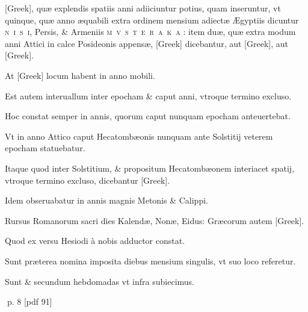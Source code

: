\begin{parnumbers}
\textgreek{[Greek]}, quæ explendis spatiis anni adiiciuntur potius, quam inseruntur, vt quinque, quæ anno æquabili extra ordinem mensium adiectæ Ægyptiis dicuntur \textsc{n~i~s~i}, Persis, \& Armeniis \textsc{m~v~s~t~e~r~a~k~a} : item duæ, quæ extra modum anni Attici in calce Posideonis  appensæ, \textgreek{[Greek]} dicebantur, aut \textgreek{[Greek]}, aut \textgreek{[Greek]}.

At \textgreek{[Greek]} locum habent in anno mobili.

Est autem interuallum inter epocham \& caput anni, vtroque termino excluso.

Hoc constat semper in annis, quorum caput nunquam epocham anteuertebat.

Vt in anno Attico caput Hecatombæonis nunquam ante Solstitij veterem epocham statuebatur.

Itaque quod inter Solstitium, \& propositum Hecatombæonem interiacet spatij, vtroque termino excluso, dicebantur \textgreek{[Greek]}.

Idem obseruabatur in annis magnis Metonis \& Calippi.

Rursus Romanorum sacri dies Kalendæ, Nonæ, Eidus: Græcorum autem \textgreek{[Greek]}.

Quod ex versu Hesiodi à nobis adductor constat.

Sunt præterea nomina imposita diebus mensium  singulis, vt suo loco referetur.

Sunt \& secundum hebdomadas vt infra subiecimus.
\end{parnumbers}
\clearpage
p. 8 [pdf 91]


